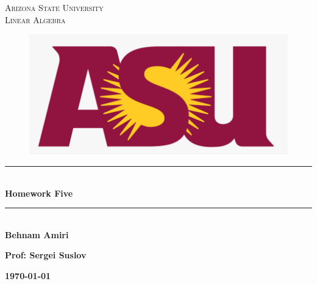 \documentclass[fleqn]{article}
\begin{document}
  \begin{titlepage}

    \newcommand{\HRule}{\rule{\linewidth}{0.5mm}}

    \center


    \textsc{\LARGE Arizona State University}\\[1.5cm]

    \textsc{\LARGE Linear Algebra }\\[1.5cm]


    \begin{figure}
      \includegraphics[width=\linewidth]{asu.png}
    \end{figure}


    \HRule \\[0.4cm]
    { \huge \bfseries Homework Five}\\[0.4cm] 
    \HRule \\[1.5cm]

    \textbf{Behnam Amiri}

    \bigbreak

    \textbf{Prof: Sergei Suslov}

    \bigbreak


    \textbf{{\large \today}\\[2cm]}

    \vfill

  \end{titlepage}
\end{document}
